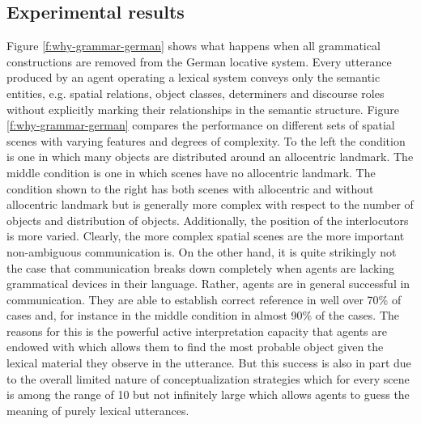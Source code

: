\subsection{Experimental results}
Figure \ref{f:why-grammar-german} shows what happens when all 
grammatical constructions are removed from the German locative 
system. Every utterance produced by an agent operating a lexical 
system conveys only the semantic entities, e.g. spatial relations, 
object classes, determiners and discourse roles without explicitly 
marking their relationships in the semantic structure. Figure 
\ref{f:why-grammar-german} compares the performance on different 
sets of spatial scenes with varying features and degrees of complexity. 
To the left the condition is one in which many objects are distributed 
around an allocentric landmark. The middle condition is one in which 
scenes have no allocentric landmark. The condition 
shown to the right has both scenes with allocentric and 
without allocentric landmark but is generally more complex with 
respect to the number of objects and distribution of objects. 
Additionally, the position of the interlocutors is more varied. Clearly, the more complex 
spatial scenes are the more important non-ambiguous communication is. On the other hand, 
it is quite strikingly not the case that communication breaks down completely when agents are lacking grammatical devices in their language. Rather, agents are in general successful in communication. 
They are able to establish correct reference in well over 70\% of cases and, for instance in the middle condition in almost 90\% of the cases. 
The reasons for this is the powerful active interpretation capacity that agents are
endowed with which allows them to find the most probable object given the 
lexical material they observe in the utterance. But this success is also in part 
due to the overall limited nature of conceptualization strategies which for every 
scene is among the range of 10 but not infinitely large which allows agents to guess 
the meaning of purely lexical utterances.

